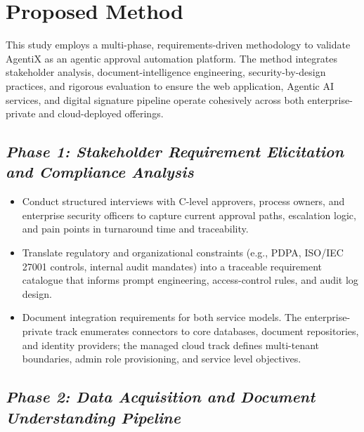 \documentclass[12pt,oneside,openright,a4paper]{cpe-english-project}
\begin{document}
\section{Proposed Method}

This study employs a multi-phase, requirements-driven methodology to
validate AgentiX as an agentic approval automation platform. The method
integrates stakeholder analysis, document-intelligence engineering,
security-by-design practices, and rigorous evaluation to ensure the web
application, Agentic AI services, and digital signature pipeline operate
cohesively across both enterprise-private and cloud-deployed offerings.

\subsection{\texorpdfstring{\emph{Phase 1: Stakeholder Requirement Elicitation and Compliance Analysis}}{Phase 1: Stakeholder Requirement Elicitation and Compliance Analysis}}

\begin{itemize}
\item Conduct structured interviews with C-level approvers, process
owners, and enterprise security officers to capture current approval
paths, escalation logic, and pain points in turnaround time and
traceability.
\item Translate regulatory and organizational constraints (e.g., PDPA,
ISO/IEC 27001 controls, internal audit mandates) into a traceable
requirement catalogue that informs prompt engineering, access-control
rules, and audit log design.
\item Document integration requirements for both service models. The
enterprise-private track enumerates connectors to core databases,
document repositories, and identity providers; the managed cloud track
defines multi-tenant boundaries, admin role provisioning, and service
level objectives.
\end{itemize}

\subsection{\texorpdfstring{\emph{Phase 2: Data Acquisition and Document Understanding Pipeline}}{Phase 2: Data Acquisition and Document Understanding Pipeline}}
\end{document}
